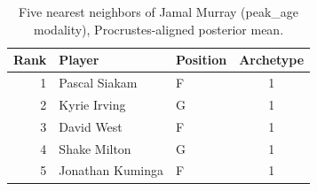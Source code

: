 \begin{table}[htbp]
  \centering\small
  \begin{tabular}{rllc}
    \toprule
    Rank & Player & Position & Archetype \\
    \midrule
    1 & Pascal Siakam & F & 1 \\
    2 & Kyrie Irving & G & 1 \\
    3 & David West & F & 1 \\
    4 & Shake Milton & G & 1 \\
    5 & Jonathan Kuminga & F & 1 \\
    \bottomrule
  \end{tabular}
  \caption{Five nearest neighbors of Jamal Murray (peak_age modality), Procrustes-aligned posterior mean.}
  \label{tab:Jamal_Murray_neighbors_peak_age}
\end{table}

